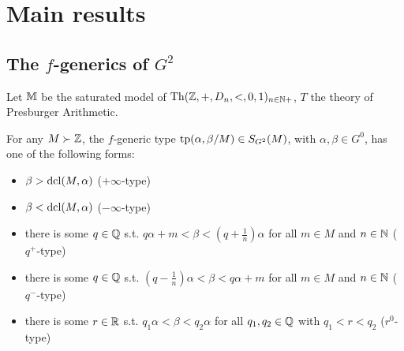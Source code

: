 \documentclass[11pt]{article}
\begin{document}
\section{Main results}
\label{sec:org04f4304}
\subsection{The \texorpdfstring{\(f\)}{f}-generics of \(G^2\)}
\label{sec:orgc6dac06}
Let \(\mathbb{M}\) be the saturated model of \(\operatorname{Th}(\mathbb{Z},+,D_n,<,0,1)_{n\in\mathbb{N}+}\), \(T\) the theory of
Presburger Arithmetic.

\begin{proposition}[]
For any \(M\succ\mathbb{Z}\), the \(f\)-generic type \(\operatorname{tp}(\alpha,\beta/M)\in S_{G^2}(M)\), with \(\alpha,\beta\in G^0\), has one of
the following forms:
\begin{itemize}
\item \(\beta>\operatorname{dcl}(M,\alpha)\) (\(+\infty\)-type)
\item \(\beta<\operatorname{dcl}(M,\alpha)\) (\(-\infty\)-type)
\item there is some \(q\in\mathbb{Q}\) s.t. \(q\alpha+m<\beta<(q+\frac{1}{n})\alpha\) for all \(m\in M\) and \(n\in\mathbb{N}\)
(\(q^+\)-type)
\item there is some \(q\in\mathbb{Q}\) s.t. \((q-\frac{1}{n})\alpha<\beta<q\alpha+m\) for all \(m\in M\) and \(n\in\mathbb{N}\)
(\(q^-\)-type)
\item there is some \(r\in\mathbb{R}\) s.t. \(q_1\alpha<\beta<q_2\alpha\) for all \(q_1,q_2\in\mathbb{Q}\) with \(q_1<r<q_2\) (\(r^0\)-type)
\end{itemize}
\end{proposition}
\end{document}
